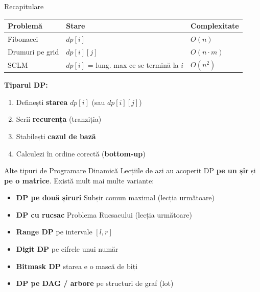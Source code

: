 \documentclass{beamer}
\begin{document}
\begin{frame}{Recapitulare}
  \begin{center}
  \begin{tabular}{l p{4.5cm} l}
    \toprule
    Problemă & Stare & Complexitate \\
    \midrule
    Fibonacci & $dp[i]$ & $O(n)$ \\
    Drumuri pe grid & $dp[i][j]$ & $O(n \cdot m)$ \\
    SCLM & $dp[i]$ = lung. max ce se termină la $i$ & $O(n^2)$ \\
    \bottomrule
  \end{tabular}
  \end{center}
  \smallskip
  \textbf{Tiparul DP:}
  \begin{enumerate}
    \item Definești \textbf{starea} $dp[i]$ (sau $dp[i][j]$)
    \item Scrii \textbf{recurența} (tranziția)
    \item Stabilești \textbf{cazul de bază}
    \item Calculezi în ordine corectă (\textbf{bottom-up})
  \end{enumerate}
\end{frame}

\begin{frame}{Alte tipuri de Programare Dinamică}
  Lecțiile de azi au acoperit DP \textbf{pe un șir} și \textbf{pe o matrice}.
  Există mult mai multe variante:
  \smallskip
  \begin{itemize}\itemsep6pt
    \item \textbf{DP pe două șiruri} \textemdash{} Subșir comun maximal (lecția următoare)
    \item \textbf{DP cu rucsac} \textemdash{} Problema Rucsacului (lecția următoare)
    \item \textbf{Range DP} \textemdash{} pe intervale $[l, r]$
    \item \textbf{Digit DP} \textemdash{} pe cifrele unui număr
    \item \textbf{Bitmask DP} \textemdash{} starea e o mască de biți
    \item \textbf{DP pe DAG / arbore} \textemdash{} pe structuri de graf (lot)
  \end{itemize}
\end{frame}
\end{document}
